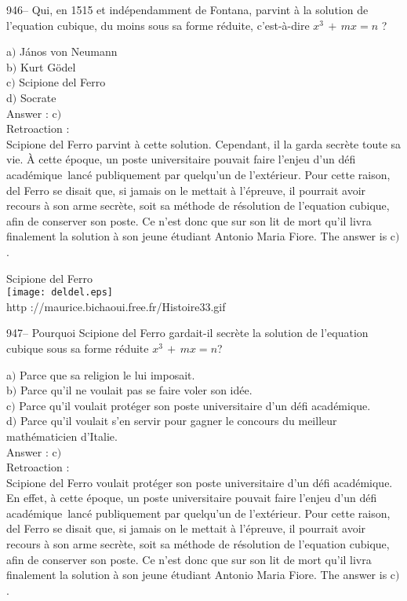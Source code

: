 ﻿\documentclass[letterpaper, 12pt]{article}
\begin{document}
946-- Qui, en 1515 et ind\'ependamment de Fontana, parvint \`a la
solution de l'equation cubique, du moins sous sa forme r\'eduite,
c'est-\`a-dire $x^3\,+\,mx=n$ ?

a$)$ J\'anos von Neumann\\
b$)$ Kurt G\"odel  \\
c$)$ Scipione del Ferro \\
d$)$ Socrate\\

Answer : c$)$\\

Retroaction : \\
Scipione del Ferro parvint \`a cette solution. Cependant, il la
garda secr\`ete toute sa vie. \`A cette \'epoque, un poste
universitaire pouvait faire l'enjeu d'un \og d\'efi acad\'emique\fg\
lanc\'e publiquement par quelqu'un de l'ext\'erieur. Pour cette
raison, del Ferro se disait que, si jamais on le mettait \`a
l'\'epreuve, il pourrait avoir recours \`a son arme secr\`ete, soit
sa m\'ethode de r\'esolution de l'equation cubique, afin de
conserver son poste. Ce n'est donc que sur son lit de mort qu'il
livra finalement la solution \`a son jeune
\'etudiant Antonio Maria Fiore. The answer is c$)$.\\

        \begin{center}
        Scipione del Ferro\\
    \texttt{[image: deldel.eps]}\\
        {\footnotesize http ://maurice.bichaoui.free.fr/Histoire33.gif}
    \end{center}

947-- Pourquoi Scipione del Ferro gardait-il secr\`ete la solution
de l'equation cubique sous sa forme r\'eduite $x^3\,+\,mx=n$?

a$)$ Parce que sa religion le lui imposait. \\
b$)$ Parce qu'il ne voulait pas se faire voler son id\'ee. \\
c$)$ Parce qu'il voulait prot\'eger son poste universitaire d'un \og
d\'efi acad\'emique\fg . \\
d$)$ Parce qu'il voulait s'en servir pour gagner le concours du meilleur
math\'ematicien d'Italie.\\

Answer : c$)$\\

Retroaction :\\
Scipione del Ferro voulait prot\'eger son poste universitaire d'un
\og d\'efi acad\'emique\fg . En effet, \`a cette \'epoque, un poste
universitaire pouvait faire l'enjeu d'un \og d\'efi acad\'emique\fg\
lanc\'e publiquement par quelqu'un de l'ext\'erieur. Pour cette
raison, del Ferro se disait que, si jamais on le mettait \`a
l'\'epreuve, il pourrait avoir recours \`a son arme secr\`ete, soit
sa m\'ethode de r\'esolution de l'equation cubique, afin de
conserver son poste. Ce n'est donc que sur son lit de mort qu'il
livra finalement la solution \`a son jeune
\'etudiant Antonio Maria Fiore. The answer is c$)$.\\
\end{document}

